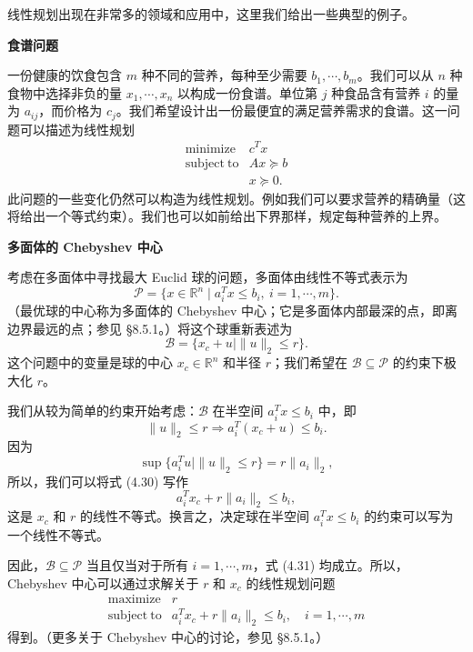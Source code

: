 \documentclass[UTF8, 12pt, fontset=fandol, oneside]{ctexart}
\begin{document}
线性规划出现在非常多的领域和应用中，这里我们给出一些典型的例子。

\noindent\textbf{食谱问题}

一份健康的饮食包含 $m$ 种不同的营养，每种至少需要 $b_1,\cdots,b_m$。我们可以从 $n$ 种食物中选择非负的量 $x_1,\cdots,x_n$ 以构成一份食谱。单位第 $j$ 种食品含有营养 $i$ 的量为 $a_{ij}$，而价格为 $c_j$。我们希望设计出一份最便宜的满足营养需求的食谱。这一问题可以描述为线性规划
\[
\begin{array}{ll}
\mathop{\mathrm{minimize}} & c^Tx\\
\mathrm{subject\ to} & Ax\succeq b\\
& x\succeq 0.
\end{array}
\]
此问题的一些变化仍然可以构造为线性规划。例如我们可以要求营养的精确量（这将给出一个等式约束）。我们也可以如前给出下界那样，规定每种营养的上界。

\noindent\textbf{多面体的 Chebyshev 中心}

考虑在多面体中寻找最大 Euclid 球的问题，多面体由线性不等式表示为
\[
\mathcal{P}=\{x\in\mathbb{R}^n\mid a_i^Tx\leq b_i,\ i=1,\cdots,m\}.
\]
（最优球的中心称为多面体的 Chebyshev 中心；它是多面体内部最深的点，即离边界最远的点；参见 §8.5.1。）将这个球重新表述为
\[
\mathcal{B}=\{x_c+u\mid \|u\|_2\leq r\}.
\]
这个问题中的变量是球的中心 $x_c\in\mathbb{R}^n$ 和半径 $r$；我们希望在 $\mathcal{B}\subseteq\mathcal{P}$ 的约束下极大化 $r$。

我们从较为简单的约束开始考虑：$\mathcal{B}$ 在半空间 $a_i^Tx\leq b_i$ 中，即
\begin{equation}
\|u\|_2\leq r\Longrightarrow a_i^T(x_c+u)\leq b_i.
\tag{4.30}
\end{equation}
因为
\[
\sup\{a_i^Tu\mid \|u\|_2\leq r\}=r\|a_i\|_2,
\]
所以，我们可以将式 (4.30) 写作
\begin{equation}
a_i^Tx_c+r\|a_i\|_2\leq b_i,
\tag{4.31}
\end{equation}
这是 $x_c$ 和 $r$ 的线性不等式。换言之，决定球在半空间 $a_i^Tx\leq b_i$ 的约束可以写为一个线性不等式。

因此，$\mathcal{B}\subseteq\mathcal{P}$ 当且仅当对于所有 $i=1,\cdots,m$，式 (4.31) 均成立。所以，Chebyshev 中心可以通过求解关于 $r$ 和 $x_c$ 的线性规划问题
\[
\begin{array}{ll}
\mathop{\mathrm{maximize}} & r\\
\mathrm{subject\ to} & a_i^Tx_c+r\|a_i\|_2\leq b_i,\quad i=1,\cdots,m
\end{array}
\]
得到。（更多关于 Chebyshev 中心的讨论，参见 §8.5.1。）
\end{document}

